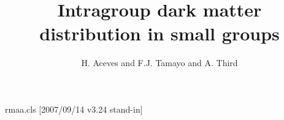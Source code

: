 \begin{filecontents*}{rmaa.cls}
[2007/09/14 v3.24 stand-in]
\newcommand{\affil}[1]{\\[1.5ex]{\itshape #1}\\[1.5ex]}
\newcommand{\altaffilmark}[1]{\textsuperscript{#1}}
\newcommand{\altaffiltext}[2]{\stepcounter{footnote}%
  \protected@xdef\@thanks{\@thanks\protect\footnotetext[#1]{#2}}}
\newcommand{\@resumen}{}
\newcommand{\resumen}[1]{\renewcommand{\@resumen}{{\ignorespaces#1}}}
\newif\if@abstractpresent
\renewcommand{\abstract}[1]{\renewcommand{\@abstract}{{\ignorespaces#1}}\@abstractpresenttrue}
\newcommand{\@abstract}{}
\newcommand{\@kwdsep}{ --- }
\newif\if@firstkwd\@firstkwdtrue
\newcommand{\@keywords}{}
\newcommand{\addkeyword}[1]{\if@firstkwd\renewcommand\@keywords{#1}\@firstkwdfalse
  \else\edef\@keywords{\@keywords\@kwdsep #1}\fi}
\newcommand{\keywords}[1]{\renewcommand{\@keywords}{#1}}
\renewcommand{\maketitle}{\par\begingroup\newpage\@maketitle\@thanks\endgroup
  \let\maketitle\relax\let\@maketitle\relax\gdef\@thanks{}\gdef\@author{}\gdef\@title{}}
\renewcommand{\@maketitle}{\null
  \begin{center}{\@title\par}\medskip\parbox{.8\textwidth}{\centering\@author\par}\par
    \if@abstractpresent\parbox{.8\textwidth}{\centerline{\bfseries Resumen}\par\@resumen
      \centerline{\bfseries Abstract}\par\@abstract\par
      \noindent Key Words:~\@keywords}\fi
  \end{center}\par}
\end{filecontents*}
\documentclass[journal]{rmaa}
\title{Intragroup dark matter distribution in small groups}
\author{H. Aceves and F.J. Tamayo  and A. Third }

\maketitle
Body.

